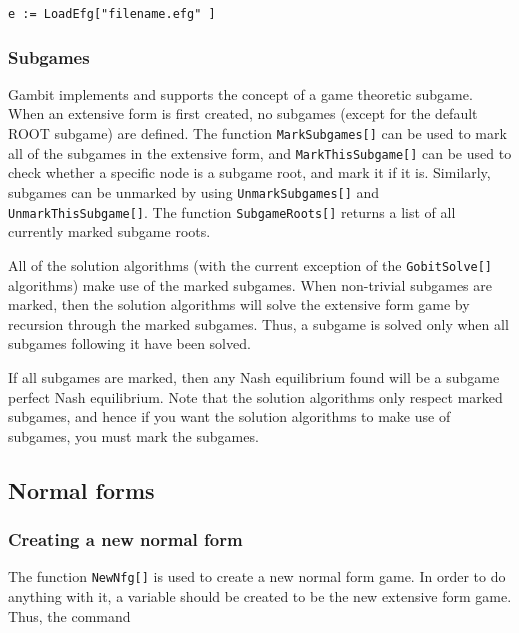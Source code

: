 \begin{verbatim}
e := LoadEfg["filename.efg" ]
\end{verbatim}

\subsubsection{Subgames}

Gambit implements and supports the concept of a game theoretic
subgame.  When an extensive form is first created, no subgames (except
for the default ROOT subgame) are defined.  The function
\verb+MarkSubgames[]+ can be used to mark all of the subgames in the
extensive form, and \verb+MarkThisSubgame[]+ can be used to check
whether a specific node is a subgame root, and mark it if it is.
Similarly, subgames can be unmarked by using \verb+UnmarkSubgames[]+
and \verb+UnmarkThisSubgame[]+.  The function \verb+SubgameRoots[]+
returns a list of all currently marked subgame roots.  

All of the solution algorithms (with the current exception of the 
\verb+GobitSolve[]+ algorithms) make use of the marked subgames.  When non-trivial 
subgames are marked, then the solution algorithms will solve the 
extensive form game by recursion through the marked subgames.  Thus, a 
subgame is solved only when all subgames following it have been 
solved.  

If all subgames are marked, then any Nash equilibrium found will be a
subgame perfect Nash equilibrium.  Note that the solution algorithms
only respect marked subgames, and hence if you want the solution
algorithms to make use of subgames, you must mark the subgames.


\subsection{Normal forms}

\subsubsection{Creating a new normal form}

The function \verb+NewNfg[]+ is used to create a new normal form game.
In order to do anything with it, a variable should be created to be
the new extensive form game.  Thus, the command

